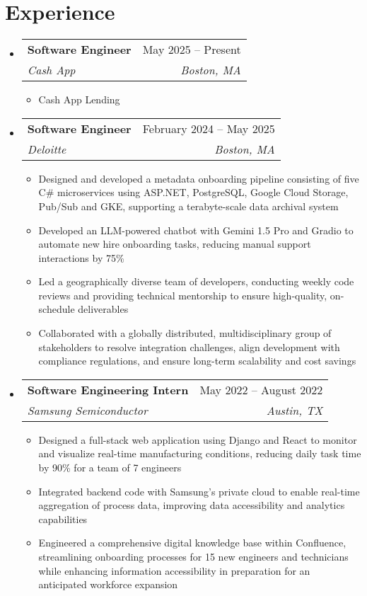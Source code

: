 \documentclass[letterpaper,11pt]{article}
\makeatletter
\newcommand{\resumeItem}[1]{
  \item\small{
    {#1 \vspace{-2pt}}
  }
}
\newcommand{\resumeSubheading}[4]{
  \vspace{-2pt}\item
    \begin{tabular*}{0.97\textwidth}[t]{l@{\extracolsep{\fill}}r}
      \textbf{#1} & #2 \\
      \textit{\small#3} & \textit{\small #4} \\
    \end{tabular*}\vspace{-7pt}
}
\newcommand{\resumeSubHeadingListStart}{\begin{itemize}[leftmargin=0.15in, label={}]}
\newcommand{\resumeSubHeadingListEnd}{\end{itemize}}
\newcommand{\resumeItemListStart}{\begin{itemize}}
\newcommand{\resumeItemListEnd}{\end{itemize}\vspace{-5pt}}
\makeatother
\begin{document}
\section{Experience}
  \resumeSubHeadingListStart    
    \resumeSubheading
      {Software Engineer}{May 2025 -- Present}
      {Cash App}{Boston, MA}
      \resumeItemListStart
        \resumeItem{Cash App Lending}
      \resumeItemListEnd
    \resumeSubheading
      {Software Engineer}{February 2024 -- May 2025}
      {Deloitte}{Boston, MA}
      \resumeItemListStart
        \resumeItem{Designed and developed a metadata onboarding pipeline consisting of five C\# microservices using  ASP.NET, PostgreSQL, Google Cloud Storage, Pub/Sub and GKE, supporting a terabyte-scale data archival system}
        \resumeItem{Developed an LLM-powered chatbot with Gemini 1.5 Pro and Gradio to automate new hire onboarding tasks, reducing manual support interactions by 75\%}
        \resumeItem{Led a geographically diverse team of developers, conducting weekly code reviews and providing technical mentorship to ensure high-quality, on-schedule deliverables}
        \resumeItem{Collaborated with a globally distributed, multidisciplinary group of stakeholders to resolve integration challenges, align development with compliance regulations, and ensure long-term scalability and cost savings}
      \resumeItemListEnd
    \resumeSubheading
      {Software Engineering Intern}{May 2022 -- August 2022}
      {Samsung Semiconductor}{Austin, TX}
      \resumeItemListStart
        \resumeItem{Designed a full-stack web application using Django and React to monitor and visualize real-time manufacturing conditions, reducing daily task time by 90\% for a team of 7 engineers}
        \resumeItem{Integrated backend code with Samsung's private cloud to enable real-time aggregation of process data, improving data accessibility and analytics capabilities}
        \resumeItem{Engineered a comprehensive digital knowledge base within Confluence, streamlining onboarding processes for 15 new engineers and technicians while enhancing information accessibility in preparation for an anticipated workforce expansion}
      \resumeItemListEnd
  \resumeSubHeadingListEnd

\end{document}
